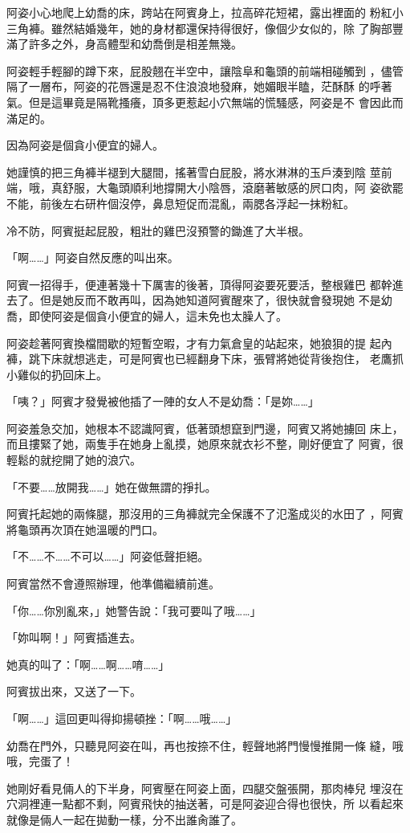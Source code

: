 阿姿小心地爬上幼喬的床，跨站在阿賓身上，拉高碎花短裙，露出裡面的
粉紅小三角褲。雖然結婚幾年，她的身材都還保持得很好，像個少女似的，除
了胸部豐滿了許多之外，身高體型和幼喬倒是相差無幾。

阿姿輕手輕腳的蹲下來，屁股翹在半空中，讓陰阜和龜頭的前端相碰觸到
，儘管隔了一層布，阿姿的花唇還是忍不住浪浪地發麻，她媚眼半瞌，茫酥酥
的呼著氣。但是這畢竟是隔靴搔癢，頂多更惹起小穴無端的慌騷感，阿姿是不
會因此而滿足的。

因為阿姿是個貪小便宜的婦人。

她謹慎的把三角褲半褪到大腿間，搖著雪白屁股，將水淋淋的玉戶湊到陰
莖前端，哦，真舒服，大龜頭順利地撐開大小陰唇，滾磨著敏感的屄口肉，阿
姿欲罷不能，前後左右研杵個沒停，鼻息短促而混亂，兩腮各浮起一抹粉紅。

冷不防，阿賓挺起屁股，粗壯的雞巴沒預警的鋤進了大半根。

「啊……」阿姿自然反應的叫出來。

阿賓一招得手，便連著幾十下厲害的後著，頂得阿姿要死要活，整根雞巴
都幹進去了。但是她反而不敢再叫，因為她知道阿賓醒來了，很快就會發現她
不是幼喬，即使阿姿是個貪小便宜的婦人，這未免也太臊人了。

阿姿趁著阿賓換檔間歇的短暫空暇，才有力氣倉皇的站起來，她狼狽的提
起內褲，跳下床就想逃走，可是阿賓也已經翻身下床，張臂將她從背後抱住，
老鷹抓小雞似的扔回床上。

「咦？」阿賓才發覺被他插了一陣的女人不是幼喬：「是妳……」

阿姿羞急交加，她根本不認識阿賓，低著頭想竄到門邊，阿賓又將她擄回
床上，而且摟緊了她，兩隻手在她身上亂摸，她原來就衣衫不整，剛好便宜了
阿賓，很輕鬆的就挖開了她的浪穴。

「不要……放開我……」她在做無謂的掙扎。

阿賓托起她的兩條腿，那沒用的三角褲就完全保護不了氾濫成災的水田了
，阿賓將龜頭再次頂在她溫暖的門口。

「不……不……不可以……」阿姿低聲拒絕。

阿賓當然不會遵照辦理，他準備繼續前進。

「你……你別亂來，」她警告說：「我可要叫了哦……」

「妳叫啊！」阿賓插進去。

她真的叫了：「啊……啊……唷……」

阿賓拔出來，又送了一下。

「啊……」這回更叫得抑揚頓挫：「啊……哦……」

幼喬在門外，只聽見阿姿在叫，再也按捺不住，輕聲地將門慢慢推開一條
縫，哦哦，完蛋了！

她剛好看見倆人的下半身，阿賓壓在阿姿上面，四腿交盤張開，那肉棒兒
埋沒在穴洞裡連一點都不剩，阿賓飛快的抽送著，可是阿姿迎合得也很快，所
以看起來就像是倆人一起在拋動一樣，分不出誰肏誰了。

